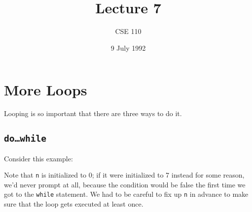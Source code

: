%
%
%


\def\brac#1{$<$#1$>$}
\def\Int{{\tt int}}
\def\int{\brac{\Int}}
\def\int{\brac{\Int}}
\def\Shortint{{\tt short~int}}
\def\shortint{\brac{\Shortint}}
\def\Longint{{\tt long~int}}
\def\longint{\brac{\Longint}}
\def\Float{{\tt float}}
\def\float{\brac{\Float}}
\def\Double{{\tt double}}
\def\double{\brac{\Double}}
\def\Char{{\tt char}}
\def\chr{\brac{\Char}}
\def\Void{{\tt void}}
\def\void{\brac{\Void}}

\def\p2#1{\brac{pointer~to #1}}

\parskip 8pt


\title{Lecture 7}
\author{CSE 110}
\date{9 July 1992}

\pagestyle{fancy}
\rhead{\thepage}
\cfoot{}





\maketitle

\section{More Loops}

Looping is so important that there are three ways to do it.

\subsection{{\tt do{\rm \ldots}while}}

Consider this example:
Note that {\tt n} is initialized to 0; if it were initialized to 7
instead for some reason, we'd never prompt at all, because the condition
would be false the first time we got to the {\tt while} statement.  We
had to be careful to fix up {\tt n} in advance to make sure that the
loop gets executed at least once.

